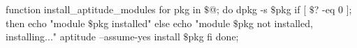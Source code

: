 \begin{myxml}
function install_aptitude_modules {
        for pkg in $\$$@; do
                dpkg -s $\$$pkg
                if [ $\$$? -eq 0 ]; then
                        echo "module $\$$pkg installed"
                else
                        echo "module $\$$pkg not installed, installing..."
                        aptitude --assume-yes install $\$$pkg
                fi
        done;
}
\end{myxml}
